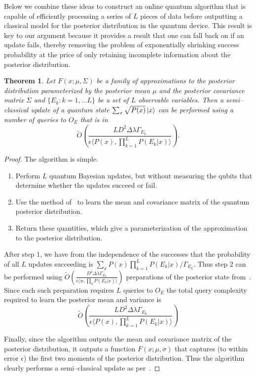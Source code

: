 \documentclass[aps,amsmath,onecolumn,amssymb]{revtex4}
\newtheorem{theorem}{Theorem}
\begin{document}
Below we combine these ideas to construct an online quantum algorithm that is capable of efficiently processing a series of $L$ pieces of data before outputting a classical model for the posterior distribution in the quantum device.  This result is key to our argument because it provides a result that one can fall back on if an update fails, thereby removing the problem of exponentially shrinking success probability at the price of only retaining incomplete information about the posterior distribution.

\begin{theorem}
Let $F(x;\mu, \Sigma)$ be a family of approximations to the posterior distribution parameterized by the posterior mean $\mu$ and the posterior covariance matrix $\Sigma$ and $\{E_k: k=1,\ldots L\}$ be a set of $L$ observable variables.  Then a semi--classical update of a quantum state $\sum_x \sqrt{P(x)} \left|x\right\rangle$ can be performed using a number of queries to $O_E$ that is in
$$
\tilde{O} \left(\frac{LD^2 \Delta  \lambda\Gamma_{E_k}}{\epsilon \langle  P(x), \prod_{k=1}^LP(E_k|x)\rangle} \right).
$$
\end{theorem}
\begin{proof}
The algorithm is simple.  
\begin{enumerate}
\item Perform $L$ quantum Bayesian updates, but without measuring the qubits that determine whether the updates succeed or fail.
\item Use the method of~ to learn the mean and covariance matrix of the quantum posterior distribution.
\item Return these quantities, which give a parameterization of the approximation to the posterior distribution.
\end{enumerate}

After step 1, we have from the independence of the successes that the probability of all $L$ updates succeeding is $\sum_x P(x) \prod_{k=1}^L P(E_k|x)/\Gamma_{E_k}$.  Thus step 2 can be performed using $\tilde{O}\left(\frac{D^2\Delta \lambda \Gamma_{E_k}}{\epsilon \langle w, \prod_k P(E_k|x)\rangle}\right)$ preparations of the posterior state from~.  Since each such preparation requires $L$ queries to $O_E$ the total query complexity required to learn the posterior mean and variance is
\begin{equation}
\tilde{O} \left(\frac{LD^2 \Delta \lambda\Gamma_{E_k} }{\epsilon \langle  P(x), \prod_{k=1}^LP(E_k|x)\rangle} \right)
\end{equation}

Finally, since the algorithm outputs the mean and covariance matrix of the posterior distribution, it outputs a function $F(x;\mu,\sigma)$ that captures (to within error $\epsilon$) the first two moments of the posterior distribution.  Thus the algorithm clearly performs a semi--classical update as per~.
\end{proof}
\end{document}
